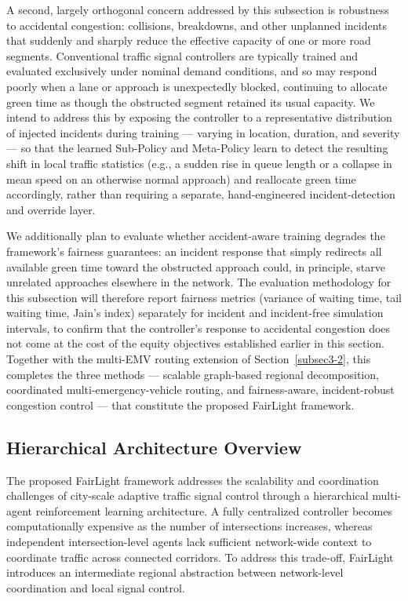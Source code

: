 \documentclass[3p,times]{elsarticle}
\theoremstyle{plain}
\theoremstyle{definition}
\begin{document}
A second, largely orthogonal concern addressed by this subsection is
robustness to accidental congestion: collisions, breakdowns,
and other unplanned incidents that suddenly and sharply reduce the
effective capacity of one or more road segments. Conventional traffic
signal controllers are typically trained and evaluated exclusively
under nominal demand conditions, and so may respond poorly when a
lane or approach is unexpectedly blocked, continuing to allocate green
time as though the obstructed segment retained its usual capacity. We
intend to address this by exposing the controller to a representative
distribution of injected incidents during training --- varying in
location, duration, and severity --- so that the learned Sub-Policy
and Meta-Policy learn to detect the resulting shift in local traffic
statistics (e.g., a sudden rise in queue length or a collapse in mean
speed on an otherwise normal approach) and reallocate green time
accordingly, rather than requiring a separate, hand-engineered
incident-detection and override layer.

We additionally plan to evaluate whether accident-aware training
degrades the framework's fairness guarantees: an incident response
that simply redirects all available green time toward the obstructed
approach could, in principle, starve unrelated approaches elsewhere in
the network. The evaluation methodology for this subsection will
therefore report fairness metrics (variance of waiting time, tail
waiting time, Jain's index) separately for incident and incident-free
simulation intervals, to confirm that the controller's response to
accidental congestion does not come at the cost of the equity
objectives established earlier in this section. Together with the
multi-EMV routing extension of Section~\ref{subsec3-2}, this
completes the three methods --- scalable graph-based regional
decomposition, coordinated multi-emergency-vehicle routing, and
fairness-aware, incident-robust congestion control --- that constitute
the proposed FairLight framework.


\subsection{Hierarchical Architecture Overview}\label{subsec3-4}

The proposed FairLight framework addresses the scalability and
coordination challenges of city-scale adaptive traffic signal control
through a hierarchical multi-agent reinforcement learning
architecture. A fully centralized controller becomes computationally
expensive as the number of intersections increases, whereas
independent intersection-level agents lack sufficient network-wide
context to coordinate traffic across connected corridors. To address
this trade-off, FairLight introduces an intermediate regional
abstraction between network-level coordination and local signal
control.
\end{document}

